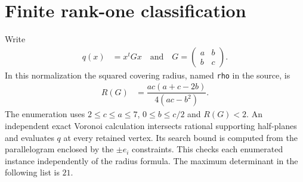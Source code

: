 \documentclass[12pt]{amsart}
\theoremstyle{remark}
\theoremstyle{definition}
\numberwithin{equation}{section}
\begin{document}
\section{Finite rank-one classification}\label{sec:classification}
Write
\begin{align*}
  q(x)&=x^{t}Gx
  \quad\text{and}\quad
  G=\begin{pmatrix}a&b\\b&c\end{pmatrix}.
\end{align*}
In this normalization the squared covering radius, named \texttt{rho}
in the source, is
\begin{align*}
  R(G)&=\dfrac{ac(a+c-2b)}{4(ac-b^{2})}.
\end{align*}
The enumeration uses $2\leq c\leq a\leq 7$, $0\leq b\leq c/2$ and
$R(G)<2$. An independent exact Voronoi calculation intersects rational
supporting half-planes and evaluates $q$ at every retained vertex. Its
search bound is computed from the parallelogram enclosed by the
$\pm e_{i}$ constraints. This checks each enumerated instance independently
of the radius formula.
The maximum determinant in the following list is $21$.
\begingroup
\small
\end{document}
